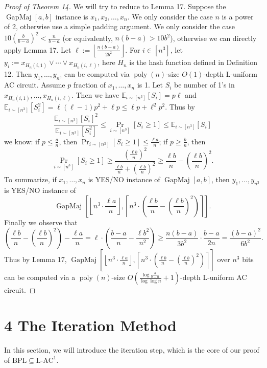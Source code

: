 \documentclass[10pt,a4paper]{article}
\begin{document}
\begin{proof}[Proof of Theorem 14]
We will try to reduce to Lemma 17. Suppose the $\operatorname{GapMaj}[a,b]$ instance is $x_1,x_2,\ldots,x_n$. We only consider the case $n$ is a power of 2, otherwise use a simple padding argument. We only consider the case $10\left(\frac b{b-a}\right)^2<\frac n{b-a}$ (or equivalently, $n(b-a)>10b^2$), otherwise we can directly apply Lemma 17.
Let $\ell:=\left\lfloor\frac{n(b-a)}{2b^2}\right\rfloor$. For $i\in[n^3]$, let $y_i:=x_{H_n(i,1)}\vee\cdots\vee x_{H_n(i,\ell)}$, here $H_n$ is the hash function defined in Definition 12. Then $y_1,\ldots,y_{n^3}$ can be computed via $\operatorname{poly}(n)$-size $O(1)$-depth L-uniform AC circuit.
Assume $p$ fraction of $x_1,\ldots,x_n$ is 1. Let $S_i$ be number of 1's in $x_{H_n(i,1)},\ldots,x_{H_n(i,\ell)}$. Then we have $\mathbb E_{i\sim[n^3]}[S_i]=p\ell$ and $\mathbb E_{i\sim[n^3]}[S_i^2]=\ell(\ell-1)p^2+\ell p\le\ell p+\ell^2 p^2$. Thus by
\[\frac{\mathbb E_{i\sim[n^3]}[S_i]^2}{\mathbb E_{i\sim[n^3]}[S_i^2]}\le\Pr_{i\sim[n^3]}[S_i\ge1]\le\mathbb E_{i\sim[n^3]}[S_i]\]
we know: if $p\le\frac an$, then $\Pr_{i\sim[n^3]}[S_i\ge1]\le\frac{\ell a}n$; if $p\ge\frac bn$, then
\[\Pr_{i\sim[n^3]}[S_i\ge1]\ge\frac{(\frac{\ell b}n)^2}{\frac{\ell b}n+(\frac{\ell b}n)^2}\ge\frac{\ell b}n-\left(\frac{\ell b}n\right)^2.\]
To summarize, if $x_1,\ldots,x_n$ is YES/NO instance of $\operatorname{GapMaj}[a,b]$, then $y_1,\ldots,y_{n^3}$ is YES/NO instance of
\[\operatorname{GapMaj}\left[\left\lfloor n^3\cdot\frac{\ell a}n\right\rfloor,\left\lceil n^3\cdot\left(\frac{\ell b}n-\left(\frac{\ell b}n\right)^2\right)\right\rceil\right].\]
Finally we observe that
\[\left(\frac{\ell b}n-\left(\frac{\ell b}n\right)^2\right)-\frac{\ell a}n=\ell\cdot\left(\frac{b-a}n-\frac{\ell b^2}{n^2}\right)\ge\frac{n(b-a)}{3b^2}\cdot\frac{b-a}{2n}=\frac{(b-a)^2}{6b^2}.\]
Thus by Lemma 17, $\operatorname{GapMaj}\left[\left\lfloor n^3\cdot\frac{\ell a}n\right\rfloor,\left\lceil n^3\cdot\left(\frac{\ell b}n-\left(\frac{\ell b}n\right)^2\right)\right\rceil\right]$ over $n^3$ bits can be computed via a $\operatorname{poly}(n)$-size $O\left(\frac{\log\frac b{b-a}}{\log\log n}+1\right)$-depth L-uniform AC circuit.
\end{proof}

\section*{4 The Iteration Method}
In this section, we will introduce the iteration step, which is the core of our proof of $\mathrm{BPL}\subseteq\mathrm{L}\text{-}\mathrm{AC}^1$.
\end{document}
